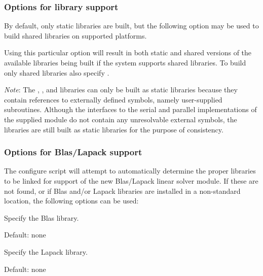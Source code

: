 \subsubsection*{Options for library support}

\noindent By default, only static libraries are built, but the following option
may be used to build shared libraries on supported platforms.

\begin{config}

\item {}

  Using this particular option will result in both static and shared versions of
  the available {\sundials} libraries being built if the system supports shared
  libraries. To build only shared libraries also specify .

  {\em Note}: The {\fcvode}, {\fkinsol}, and {\fida} libraries can only be built as
  static libraries because they contain references to externally defined symbols,
  namely user-supplied {\F} subroutines.  Although the {\F} interfaces to the serial
  and parallel implementations of the supplied {\nvector} module do not contain any
  unresolvable external symbols, the libraries are still built as static libraries
  for the purpose of consistency.

\end{config}


\subsubsection*{Options for Blas/Lapack support}

\noindent The configure script will attempt to automatically determine the
proper libraries to be linked for support of the new Blas/Lapack linear solver module.
If these are not found, or if Blas and/or Lapack libraries are installed in a
non-standard location, the following options can be used:

\begin{config}

\item {}

  Specify the Blas library.

  Default: none

\item {}

  Specify the Lapack library.

  Default: none

\end{config}


